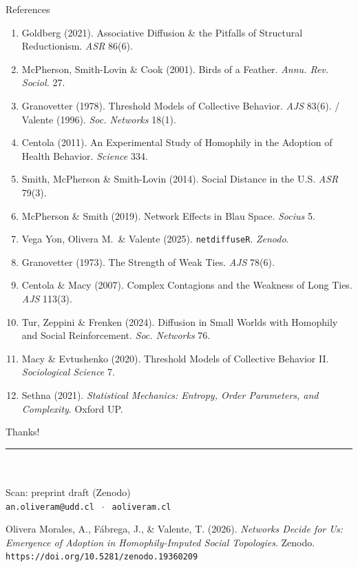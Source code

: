 \documentclass[aspectratio=169,11pt]{beamer}
\begin{document}
\begin{frame}{References}
\footnotesize
\begin{enumerate}\itemsep1.2pt
  \item Goldberg (2021). Associative Diffusion \& the Pitfalls of Structural Reductionism. \emph{ASR} 86(6).
  \item McPherson, Smith-Lovin \& Cook (2001). Birds of a Feather. \emph{Annu. Rev. Sociol.} 27.
  \item Granovetter (1978). Threshold Models of Collective Behavior. \emph{AJS} 83(6). / Valente (1996). \emph{Soc. Networks} 18(1).
  \item Centola (2011). An Experimental Study of Homophily in the Adoption of Health Behavior. \emph{Science} 334.
  \item Smith, McPherson \& Smith-Lovin (2014). Social Distance in the U.S. \emph{ASR} 79(3).
  \item McPherson \& Smith (2019). Network Effects in Blau Space. \emph{Socius} 5.
  \item Vega Yon, Olivera M.\ \& Valente (2025). \texttt{netdiffuseR}. \emph{Zenodo}.
  \item Granovetter (1973). The Strength of Weak Ties. \emph{AJS} 78(6).
  \item Centola \& Macy (2007). Complex Contagions and the Weakness of Long Ties. \emph{AJS} 113(3).
  \item Tur, Zeppini \& Frenken (2024). Diffusion in Small Worlds with Homophily and Social Reinforcement. \emph{Soc. Networks} 76.
  \item Macy \& Evtushenko (2020). Threshold Models of Collective Behavior II. \emph{Sociological Science} 7.
  \item Sethna (2021). \emph{Statistical Mechanics: Entropy, Order Parameters, and Complexity}. Oxford UP.
\end{enumerate}
\end{frame}

\begin{frame}[plain]
  \vfill
  \begin{center}
    {\Large Thanks!}\\[2pt]
    {\color{ndred}\rule{0.30\textwidth}{1.1pt}}\\[0.6cm]
    \\[0.3cm]
    {\footnotesize Scan: preprint draft (Zenodo)}\\[5pt]
    {\footnotesize \texttt{an.oliveram@udd.cl} $\;\cdot\;$ \texttt{aoliveram.cl}}\\[6pt]
    \parbox{0.82\textwidth}{\centering\scriptsize\color{ndgray}
      Olivera Morales, A., Fábrega, J., \& Valente, T. (2026). \emph{Networks Decide for Us:
      Emergence of Adoption in Homophily-Imputed Social Topologies}. Zenodo.
      \texttt{https://doi.org/10.5281/zenodo.19360209}}
  \end{center}
  \vfill
\end{frame}
\end{document}
